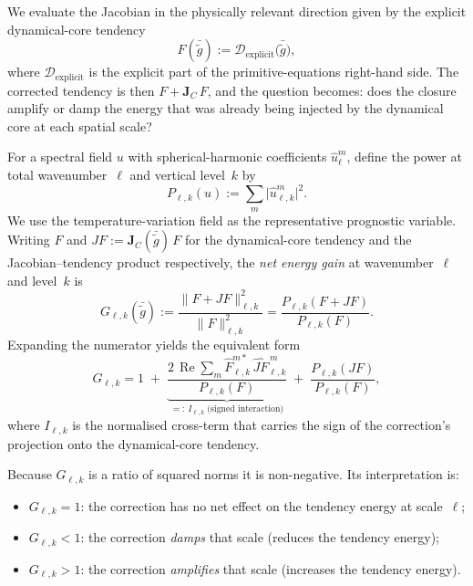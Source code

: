 We evaluate the Jacobian in the physically relevant direction given by
the explicit dynamical-core tendency
\begin{equation}
  F(\bar{\tilde{g}})
  :=
  \mathcal{D}_{\mathrm{explicit}}\!\bigl(\bar{\tilde{g}}\bigr),
\end{equation}
where $\mathcal{D}_{\mathrm{explicit}}$ is the explicit part of the
primitive-equations right-hand side.  The corrected tendency is then
$F + \mathbf{J}_{C}\,F$, and the question becomes: does the closure
amplify or damp the energy that was already being injected by the
dynamical core at each spatial scale?

For a spectral field $u$ with spherical-harmonic coefficients
$\hat{u}_{\ell}^{m}$, define the power at total wavenumber~$\ell$ and
vertical level~$k$ by
\begin{equation}
  P_{\ell,k}(u)
  :=
  \sum_{m} \bigl|\hat{u}_{\ell,k}^{m}\bigr|^{2}.
\end{equation}
We use the temperature-variation field as the representative prognostic
variable.  Writing $F$ and $JF := \mathbf{J}_{C}(\bar{\tilde{g}})\,F$
for the dynamical-core tendency and the Jacobian--tendency product
respectively, the \emph{net energy gain} at wavenumber~$\ell$ and
level~$k$ is
\begin{equation}\label{eq:net-gain}
  G_{\ell,k}(\bar{\tilde{g}})
  :=
  \frac{\|F + JF\|_{\ell,k}^{2}}{\|F\|_{\ell,k}^{2}}
  =
  \frac{P_{\ell,k}(F + JF)}{P_{\ell,k}(F)}.
\end{equation}
Expanding the numerator yields the equivalent form
\begin{equation}
  G_{\ell,k}
  =
  1
  \;+\;
  \underbrace{
    \frac{2\,\operatorname{Re}\!\sum_{m}
          \hat{F}_{\ell,k}^{m*}\,\widehat{JF}_{\ell,k}^{\,m}}
         {P_{\ell,k}(F)}
  }_{=:\,I_{\ell,k}\;\text{(signed interaction)}}
  \;+\;
  \frac{P_{\ell,k}(JF)}{P_{\ell,k}(F)},
\end{equation}
where $I_{\ell,k}$ is the normalised cross-term that carries the sign of the
correction's projection onto the dynamical-core tendency.

Because $G_{\ell,k}$ is a ratio of squared norms it is non-negative.
Its interpretation is:
\begin{itemize}
  \item $G_{\ell,k} = 1$: the correction has no net effect on the
        tendency energy at scale~$\ell$;
  \item $G_{\ell,k} < 1$: the correction \emph{damps} that scale
        (reduces the tendency energy);
  \item $G_{\ell,k} > 1$: the correction \emph{amplifies} that scale
        (increases the tendency energy).
\end{itemize}

